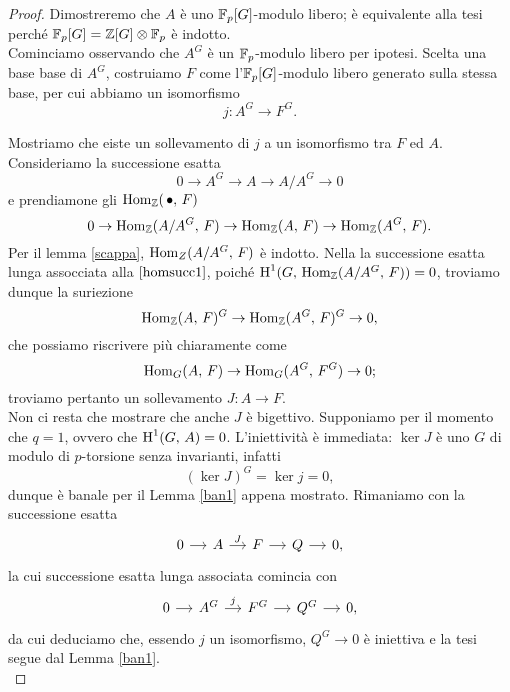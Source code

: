 \begin{proof}
	Dimostreremo che $ A $ è uno $ \mathbb{F}_p[G] $-modulo libero; è equivalente alla tesi perché $ \mathbb{F}_p[G] = \mathbb{Z}[G] \otimes \mathbb{F}_p $ è indotto. \\
	
	Cominciamo osservando che $ A^G $ è un $ \mathbb{F}_p $-modulo libero per ipotesi. Scelta una base base di $ A^G $, costruiamo $ F $ come l'$ \mathbb{F}_p[G] $-modulo libero generato sulla stessa base, per cui abbiamo un isomorfismo
	\[ j \colon A^G \to F^G. \]
	
	Mostriamo che eiste un sollevamento di $ j $ a un isomorfismo tra $ F $ ed $ A $. Consideriamo la successione esatta
	\[ 0 \to A^G \to A \to A/A^G \to 0 \]
	e prendiamone gli $ \operatorname{Hom}_{\mathbb{Z}}(\, \bullet, \, F) $
	\begin{equation}\label{homsucc1}
		0 \to \operatorname{Hom}_{\mathbb{Z}}(A/A^G, \, F) \to \operatorname{Hom}_{\mathbb{Z}}(A, \, F) \to \operatorname{Hom}_{\mathbb{Z}}(A^G, \, F).
	\end{equation}
	Per il lemma \ref{scappa}, $ \operatorname{Hom}_Z(A/A^G, \, F) $ è indotto.  Nella la successione esatta lunga assocciata alla $ \ref{homsucc1} $, poiché $ \operatorname{H}^1(G, \, \operatorname{Hom}_{\mathbb{Z}}(A/A^G, \, F)) = 0 $, troviamo dunque la suriezione
	\[ \operatorname{Hom}_{\mathbb{Z}}(A, \, F)^G \to \operatorname{Hom}_{\mathbb{Z}}(A^G, \, F)^G \to 0, \]
	che possiamo riscrivere più chiaramente come
	\[ \operatorname{Hom}_G(A, \, F) \to \operatorname{Hom}_G(A^G, \, F^G) \to 0; \]
	troviamo pertanto un sollevamento $ J \colon A \to F $.\\
	
	Non ci resta che mostrare che anche $ J $ è bigettivo. Supponiamo per il momento che $ q = 1 $, ovvero che $ \operatorname{H}^1(G, \, A) = 0 $. L'iniettività è immediata: $ \ker J $ è uno $ G $ di modulo di $ p $-torsione senza invarianti, infatti
	\[ (\ker J)^G = \ker j = 0, \]
	dunque è banale per il Lemma \ref{ban1} appena mostrato. Rimaniamo con la successione esatta
	\[ \begin{tikzcd}[column sep = small]
	0 \rar& A \rar["J"]& F \rar& Q \rar& 0,
	\end{tikzcd} \]
	la cui successione esatta lunga associata comincia con
	\[ \begin{tikzcd}[column sep = small]
	0 \rar & A^G \rar["j"] & F^G \rar & Q^G \rar & 0,
	\end{tikzcd} \]
	da cui deduciamo che, essendo $ j $ un isomorfismo, $ Q^G \to 0 $ è iniettiva e la tesi segue dal Lemma \ref{ban1}.\\
	

\end{proof}
